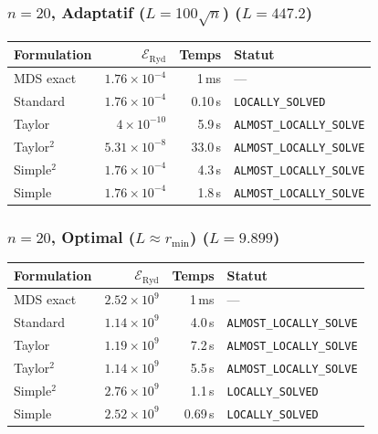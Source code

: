 \subsubsection{$n=20$, Adaptatif ($L{=}100\sqrt{n}$) ($L=447.2$)}
\begin{longtable}{@{}lrrl@{}}
  \toprule
  Formulation & $\mathcal{E}_{\mathrm{Ryd}}$ & Temps & Statut \\
  \midrule
  \endhead
  MDS exact & $1.76\times10^{-4}$ & 1\,ms & --- \\
  Standard & $1.76\times10^{-4}$ & 0.10\,s & \texttt{LOCALLY\_SOLVED} \\
  Taylor & $4\times10^{-10}$ & 5.9\,s & \texttt{ALMOST\_LOCALLY\_SOLVE} \\
  Taylor$^2$ & $5.31\times10^{-8}$ & 33.0\,s & \texttt{ALMOST\_LOCALLY\_SOLVE} \\
  Simple$^2$ & $1.76\times10^{-4}$ & 4.3\,s & \texttt{ALMOST\_LOCALLY\_SOLVE} \\
  Simple & $1.76\times10^{-4}$ & 1.8\,s & \texttt{ALMOST\_LOCALLY\_SOLVE} \\
  \bottomrule
\end{longtable}

\subsubsection{$n=20$, Optimal ($L{\approx}r_{\min}$) ($L=9.899$)}
\begin{longtable}{@{}lrrl@{}}
  \toprule
  Formulation & $\mathcal{E}_{\mathrm{Ryd}}$ & Temps & Statut \\
  \midrule
  \endhead
  MDS exact & $2.52\times10^{9}$ & 1\,ms & --- \\
  Standard & $1.14\times10^{9}$ & 4.0\,s & \texttt{ALMOST\_LOCALLY\_SOLVE} \\
  Taylor & $1.19\times10^{9}$ & 7.2\,s & \texttt{ALMOST\_LOCALLY\_SOLVE} \\
  Taylor$^2$ & $1.14\times10^{9}$ & 5.5\,s & \texttt{ALMOST\_LOCALLY\_SOLVE} \\
  Simple$^2$ & $2.76\times10^{9}$ & 1.1\,s & \texttt{LOCALLY\_SOLVED} \\
  Simple & $2.52\times10^{9}$ & 0.69\,s & \texttt{LOCALLY\_SOLVED} \\
  \bottomrule
\end{longtable}

